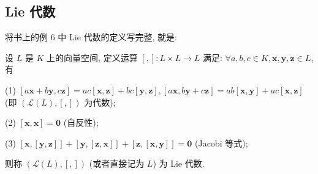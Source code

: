 \documentclass[color=black,device=normal,lang=cn,mode=geye]{elegantnote}
\begin{document}
\subsection{Lie 代数}
将书上的例 6 中 Lie 代数的定义写完整, 就是:
\begin{definition}
    设 $L$ 是 $K$ 上的向量空间, 定义运算 $[,]:L\times L\to L$ 满足: $\forall a,b,c\in K,\boldsymbol{x},\boldsymbol{y},\boldsymbol{z}\in L$, 有

    (1) $[a\boldsymbol{x}+b\boldsymbol{y},c\boldsymbol{z}]=ac[\boldsymbol{x},\boldsymbol{z}]+bc[\boldsymbol{y},\boldsymbol{z}],[a\boldsymbol{x},b\boldsymbol{y}+c\boldsymbol{z}]=ab[\boldsymbol{x},\boldsymbol{y}]+ac[\boldsymbol{x},\boldsymbol{z}]$ (即 $(\mathcal{L}(L),[,])$ 为代数);

    (2) $[\boldsymbol{x},\boldsymbol{x}]=\boldsymbol{0}$ (自反性);

    (3) $[\boldsymbol{x},[\boldsymbol{y},\boldsymbol{z}]]+[\boldsymbol{y},[\boldsymbol{z},\boldsymbol{x}]]+[\boldsymbol{z},[\boldsymbol{x},\boldsymbol{y}]]=\boldsymbol{0}$ (Jacobi 等式);

    则称 $(\mathcal{L}(L),[,])$ (或者直接记为 $L$) 为 Lie 代数.
\end{definition}
\end{document}
